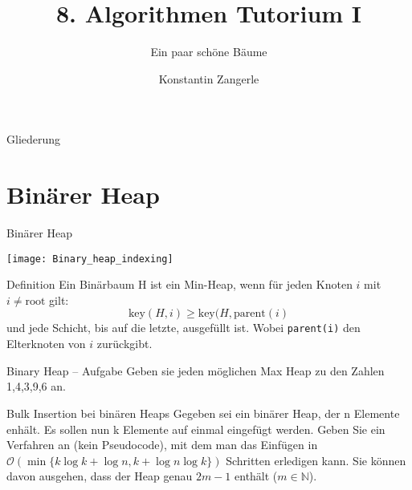 \documentclass[18pt]{beamer}
\title[Algo I Tut]{8. Algorithmen Tutorium I}
\subtitle{Ein paar schöne Bäume}
\author[Zangerle]{Konstantin Zangerle}
\institute{Institut für Theoretische Informatik}
\newcommand{\N}{\mathbb{N}}
\newcommand{\Oh}{\mathcal{O}}
\begin{document}

\begin{frame}
\titlepage
\end{frame}

\begin{frame}{Gliederung}
 \tableofcontents
\end{frame}

\section{Binärer Heap}
\begin{frame}[fragile]{Binärer Heap}

\hspace{13em}
\texttt{[image: Binary\_heap\_indexing]}
 \begin{block}{Definition}
  Ein Binärbaum H ist ein Min-Heap, wenn für jeden Knoten $i$ mit $i \neq \text{root}$ gilt:
  $$\text{key}(H,i) \geq \text{key}(H,\text{parent}(i)$$
  und jede Schicht, bis auf die letzte, ausgefüllt ist.
  Wobei \verb|parent(i)| den Elterknoten von $i$ zurückgibt.
 \end{block}

\end{frame}

\begin{frame}{Binary Heap -- Aufgabe}
Geben sie jeden möglichen Max Heap zu den Zahlen 1,4,3,9,6 an.
\end{frame}

\begin{frame}{Bulk Insertion bei binären Heaps}
Gegeben sei ein binärer Heap, der n Elemente enhält. Es sollen nun k Elemente auf einmal
eingefügt werden. Geben Sie ein Verfahren an (kein Pseudocode), mit dem man das Einfügen in $\Oh(\min\{k \log k + \log n, k + \log n \log k \})$ Schritten erledigen kann.
Sie können davon ausgehen, dass der Heap genau $2m - 1$ enthält ($m \in \N$).
\end{frame}
\end{document}
